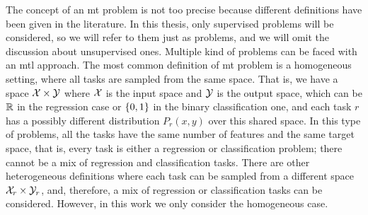 The concept of an \acrshort{mt} problem is not too precise because different definitions have been given in the literature. 
In this thesis, only supervised problems will be considered, so we will refer to them just as problems, and we will omit the discussion about unsupervised ones. 
%
Multiple kind of problems can be faced with an \acrshort{mtl} approach. 
%
The most common definition of \acrshort{mt} problem is a homogeneous setting, where all tasks are sampled from the same space. That is, we have a space $\mathcal{X} \times \mathcal{Y}$ where $\mathcal{X}$ is the input space and $\mathcal{Y}$ is the output space, which can be $\mathbb{R}$ in the regression case or $\left\{0, 1\right\}$ in the binary classification one, and each task $r$ has a possibly different distribution $P_r(x, y)$ over this shared space.
In this type of problems, all the tasks have the same number of features and the same target space, that is, every task is either a regression or classification problem; there cannot be a mix of regression and classification tasks.
%
There are other heterogeneous definitions where each task can be sampled from a different space $\mathcal{X}_r \times \mathcal{Y}_r$, and, therefore, a mix of regression or classification tasks can be considered. However, in this work we only consider the homogeneous case.
%

